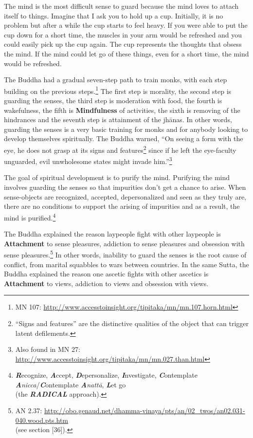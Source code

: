 The mind is the most difficult sense to guard because the mind loves to attach itself to things. Imagine that I ask you to hold up a cup. Initially, it is no problem but after a while the cup starts to feel heavy. If you were able to put the cup down for a short time, the muscles in your arm would be refreshed and you could easily pick up the cup again. The cup represents the thoughts that obsess the mind. If the mind could let go of these things, even for a short time, the mind would be refreshed.

The Buddha had a gradual seven-step path to train monks, with each step building on the previous steps.\footnote{MN 107: \url{http://www.accesstoinsight.org/tipitaka/mn/mn.107.horn.html}} The first step is morality, the second step is guarding the senses, the third step is moderation with food, the fourth is wakefulness, the fifth is \textbf{Mindfulness} of activities, the sixth is removing of the hindrances and the seventh step is attainment of the jhānas. In other words, guarding the senses is a very basic training for monks and for anybody looking to develop themselves spiritually. The Buddha warned, “On seeing a form with the eye, he does not grasp at its signs and features\footnote{“Signs and features” are the distinctive qualities of the object that can trigger latent defilements.} since if he left the eye-faculty unguarded, evil unwholesome states might invade him.”\footnote{Also found in MN 27: \url{http://www.accesstoinsight.org/tipitaka/mn/mn.027.than.html}}

The goal of spiritual development is to purify the mind. Purifying the mind involves guarding the senses so that impurities don’t get a chance to arise. When sense-objects are recognized, accepted, depersonalized and seen as they truly are, there are no conditions to support the arising of impurities and as a result, the mind is purified.\footnote{\textit{\textbf{R}}ecognize, \textbf{\textit{A}}ccept, \textit{\textbf{D}}epersonalize, \textbf{\textit{I}}nvestigate, \textit{\textbf{C}}ontemplate \textbf{\textit{A}}\textit{nicca}/\textit{\textbf{C}}ontemplate \textbf{\textit{A}}\textit{nattā}, \textbf{\textit{L}}et go \\(the \textit{\textbf{RADICAL}} approach).}

The Buddha explained the reason laypeople fight with other laypeople is \textbf{Attachment} to sense pleasures, addiction to sense pleasures and obsession with sense pleasures.\footnote{AN 2.37: \url{http://obo.genaud.net/dhamma-vinaya/pts/an/02_twos/an02.031-040.wood.pts.htm}\\(see section [36]).} In other words, inability to guard the senses is the root cause of conflict, from marital squabbles to wars between countries. In the same Sutta, the Buddha explained the reason one ascetic fights with other ascetics is \textbf{Attachment} to views, addiction to views and obsession with views.

